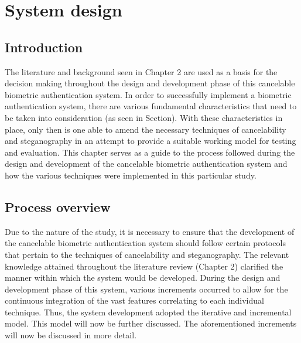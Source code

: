 \chapter{System design}

\ifpdf
    \graphicspath{{Chapter3/Figs/Raster/}{Chapter3/Figs/PDF/}{Chapter3/Figs/}}
\else
    \graphicspath{{Chapter3/Figs/Vector/}{Chapter3/Figs/}}
\fi

\section{Introduction}

The literature and background seen in Chapter 2 are used as a basis for the decision making throughout the design and development phase of this cancelable biometric authentication system. 
In order to successfully implement a biometric authentication system, there are various fundamental characteristics that need to be taken into consideration (as seen in Section). With these characteristics in place, only then is one able to amend the necessary techniques of cancelability and steganography in an attempt to provide a suitable working model for testing and evaluation. 
This chapter serves as a guide to the process followed during the design and development of the cancelable biometric authentication system and how the various techniques were implemented in this particular study.


\section{Process overview}

Due to the nature of the study, it is necessary to ensure that the development of the cancelable biometric authentication system should follow certain protocols that pertain to the techniques of cancelability and steganography. The relevant knowledge attained throughout the literature review (Chapter 2) clarified the manner within which the system would be developed. During the design and development phase of this system, various increments occurred to allow for the continuous integration of the vast features correlating to each individual technique. Thus, the system development adopted the iterative and incremental model. This model will now be further discussed. The aforementioned increments will now be discussed in more detail.

